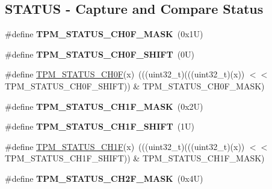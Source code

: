 \subsection*{S\+T\+A\+T\+US -\/ Capture and Compare Status}
\begin{DoxyCompactItemize}
\item 
\mbox{\label{group___t_p_m___register___masks_ga2441823dbe4ebc3b7f88773a95eff6d6}} 
\#define {\bfseries T\+P\+M\+\_\+\+S\+T\+A\+T\+U\+S\+\_\+\+C\+H0\+F\+\_\+\+M\+A\+SK}~(0x1\+U)
\item 
\mbox{\label{group___t_p_m___register___masks_gab7b122b8ff741ae1bacff6a0929d7adc}} 
\#define {\bfseries T\+P\+M\+\_\+\+S\+T\+A\+T\+U\+S\+\_\+\+C\+H0\+F\+\_\+\+S\+H\+I\+FT}~(0\+U)
\item 
\#define \mbox{\hyperlink{group___t_p_m___register___masks_ga172b7520f10a6535f2a4ffb65bb84278}{T\+P\+M\+\_\+\+S\+T\+A\+T\+U\+S\+\_\+\+C\+H0F}}(x)~(((uint32\+\_\+t)(((uint32\+\_\+t)(x)) $<$$<$ T\+P\+M\+\_\+\+S\+T\+A\+T\+U\+S\+\_\+\+C\+H0\+F\+\_\+\+S\+H\+I\+FT)) \& T\+P\+M\+\_\+\+S\+T\+A\+T\+U\+S\+\_\+\+C\+H0\+F\+\_\+\+M\+A\+SK)
\item 
\mbox{\label{group___t_p_m___register___masks_gaed654f625ebff2d9f8a2cc89ef410330}} 
\#define {\bfseries T\+P\+M\+\_\+\+S\+T\+A\+T\+U\+S\+\_\+\+C\+H1\+F\+\_\+\+M\+A\+SK}~(0x2\+U)
\item 
\mbox{\label{group___t_p_m___register___masks_ga531fc0daa18458bc1d781df31cffbfe9}} 
\#define {\bfseries T\+P\+M\+\_\+\+S\+T\+A\+T\+U\+S\+\_\+\+C\+H1\+F\+\_\+\+S\+H\+I\+FT}~(1\+U)
\item 
\#define \mbox{\hyperlink{group___t_p_m___register___masks_ga8770f4b598143b6884a2e8302c49c572}{T\+P\+M\+\_\+\+S\+T\+A\+T\+U\+S\+\_\+\+C\+H1F}}(x)~(((uint32\+\_\+t)(((uint32\+\_\+t)(x)) $<$$<$ T\+P\+M\+\_\+\+S\+T\+A\+T\+U\+S\+\_\+\+C\+H1\+F\+\_\+\+S\+H\+I\+FT)) \& T\+P\+M\+\_\+\+S\+T\+A\+T\+U\+S\+\_\+\+C\+H1\+F\+\_\+\+M\+A\+SK)
\item 
\mbox{\label{group___t_p_m___register___masks_ga151f2aa4b0d2eef94e75170580ca4c13}} 
\#define {\bfseries T\+P\+M\+\_\+\+S\+T\+A\+T\+U\+S\+\_\+\+C\+H2\+F\+\_\+\+M\+A\+SK}~(0x4\+U)
\item 

\end{DoxyCompactItemize}
